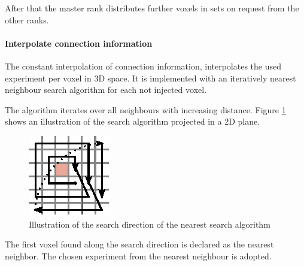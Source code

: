 After that the master rank distributes further voxels in sets on request from the other ranks.

\paragraph{Interpolate connection information}
\label{par:interpolation}
The constant interpolation of connection information, interpolates the used experiment per voxel in 3D space.
It is implemented with an iteratively nearest neighbour search algorithm for each not injected voxel.

The algorithm iterates over all neighbours with increasing distance.
Figure \ref{longrange} shows an illustration of the search algorithm
projected in a 2D plane.
\begin{figure}[ht!]
\centering
\includegraphics[scale=2.5]{pictures/longRange_Nearest_parallelAlg.eps}
\caption{Illustration of the search direction of the nearest search algorithm}
\label{longrange}
\end{figure}
The first voxel found along the search direction is declared as the nearest neighbor.
The chosen experiment from the nearest neighbour is adopted.

